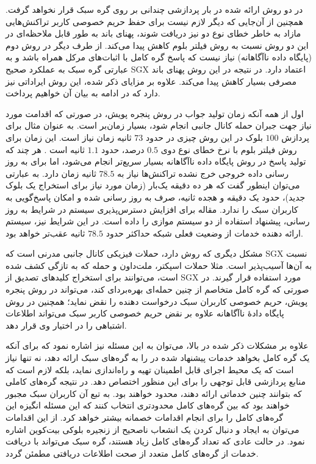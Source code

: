 در دو روش ارائه شده در \cite{Matetic2019} بار پردازشی چندانی بر روی گره سبک قرار نخواهد گرفت. همچنین از آن‌جایی که دیگر لازم نیست برای حفظ حریم خصوصی کاربر تراکنش‌هایی مازاد به خاطر خطای نوع دو نیز دریافت شوند، پهنای باند به طور قابل ملاحظه‌ای در این دو روش نسبت به روش فیلتر بلوم کاهش پیدا می‌کند. از طرف دیگر در روش دوم (پایگاه داده ناآگاهانه) نیاز نیست که پاسخ گره کامل با اثبات‌های مرکل همراه باشد و به عبارتی گره سبک به عملکرد صحیح SGX اعتماد دارد. در نتیجه در این روش پهنای باند مصرفی بسیار کاهش پیدا می‌کند. علاوه بر مزایای ذکر شده، این روش ایراداتی نیز دارد که در ادامه به بیان آن خواهیم پرداخت.

اول از همه آنکه زمان تولید جواب در روش پنجره پویش، در صورتی که اقدامت مورد نیاز جهت جبران حمله کانال جانبی انجام شود، بسیار زمان‌بر است. به عنوان مثال برای پردازش  $100$ بلوک در این روش چیزی در حدود $73$ ثانیه زمان نیاز است. این زمان برای روش فیلتر بلوم با نرخ خطای نوع دوی $0.5$ درصد، حدود $1.1$ ثانیه است \cite{Matetic2019}. هر چند که تولید پاسخ در روش  پایگاه داده ناآگاهانه بسیار سریع‌تر انجام می‌شود، اما برای به روز رسانی داده خروجی‌ خرج نشده تراکنش‌ها نیاز به $78.5$ ثانیه زمان دارد. به عبارتی می‌توان اینطور گفت که هر ده دقیقه یک‌بار (زمان مورد نیاز برای استخراج یک بلوک جدید)، حدود یک دقیقه و هجده ثانیه،‌ صرف به روز رسانی شده و امکان پاسخ‌گویی به کاربران سبک را ندارد. مقاله \cite{Matetic2019} برای افزایش دسترس‌پذیری سیستم در شرایط به روز رسانی، پیشنهاد استفاده از دو سیستم موازی را داده است. در این شرایط نیز،‌ سیستم ارائه دهنده خدمات از وضعیت فعلی شبکه حداکثر حدود $78.5$ ثانیه عقب‌تر خواهد بود.

مشکل دیگری که روش \cite{Matetic2019} دارد، حملات فیزیکی کانال جانبی مدرنی است که SGX نسبت به آن‌ها آسیب‌پذیر است. مثلا حملات اسپکتر\cite{Kocher2019}، ملت‌داون\cite{Lipp2020} و حمله \cite{Bulck2020} که به تازگی کشف شده است، می‌توانند برای استخراج کلید‌های تصدیق از ‌SGX مورد استفاده قرار گیرند. در صورتی که گره کامل متخاصم از چنین حمله‌ای بهره‌بردای کند، می‌تواند در روش پنجره پویش، حریم خصوصی کاربران سبک درخواست دهنده را نقض نماید؛ همچنین در روش پایگاه دادهٔ ناآگاهانه علاوه بر نقض حریم خصوصی کاربر سبک می‌تواند اطلاعات اشتباهی را در اختیار وی قرار دهد.

علاوه بر مشکلات ذکر شده در بالا، می‌توان به این مسئله نیز اشاره نمود که برای آنکه یک گره کامل بخواهد خدمات پیشنهاد شده در \cite{Matetic2019} را به گره‌های سبک ارائه دهد، نه تنها نیاز است که یک محیط اجرای قابل اطمینان تهیه و راه‌اندازی نماید، بلکه لازم است که منابع پردازشی قابل توجهی را برای این منظور اختصاص دهد. در نتیجه گره‌های کاملی که بتوانند چنین خدماتی ارائه دهند، محدود خواهند بود. به تبع آن کاربران سبک مجبور خواهند بود که بین گره‌های کامل محدود‌تری انتخاب کنند که این مسئله انگیزه این گره‌های کامل را برای انجام اقدامات خصمانه بیشتر خواهد کرد. از این اقدامات می‌توان به ایجاد و دنبال کردن یک انشعاب ناصحیح از زنجیره بلوکی بیت‌کوین اشاره نمود. در حالت عادی که تعداد گره‌های کامل زیاد هستند، گره سبک می‌تواند با دریافت خدمات از گره‌های کامل متعدد از صحت اطلاعات دریافتی مطمئن گردد.

